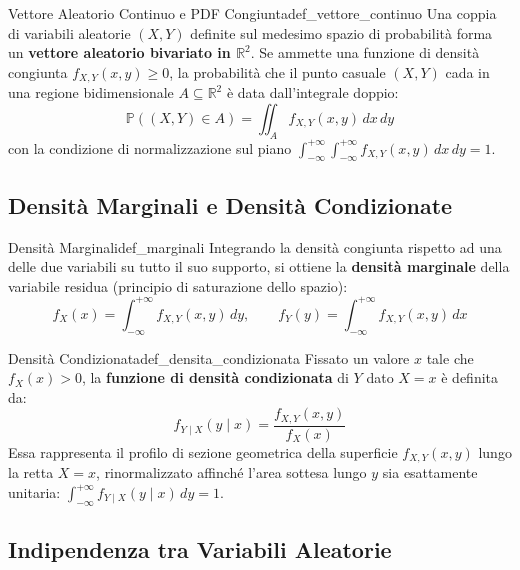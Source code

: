 \begin{definizione}{Vettore Aleatorio Continuo e PDF Congiunta}{def_vettore_continuo}
Una coppia di variabili aleatorie $(X, Y)$ definite sul medesimo spazio di probabilità forma un \textbf{vettore aleatorio bivariato in $\mathbb{R}^2$}. Se ammette una funzione di densità congiunta $f_{X,Y}(x, y) \ge 0$, la probabilità che il punto casuale $(X, Y)$ cada in una regione bidimensionale $A \subseteq \mathbb{R}^2$ è data dall'integrale doppio:
\begin{equation}
    \mathbb{P}((X, Y) \in A) = \iint_A f_{X,Y}(x, y) \, dx \, dy
\end{equation}
con la condizione di normalizzazione sul piano $\int_{-\infty}^{+\infty}\int_{-\infty}^{+\infty} f_{X,Y}(x, y) \, dx \, dy = 1$.
\end{definizione}

\subsection{Densità Marginali e Densità Condizionate}

\begin{definizione}{Densità Marginali}{def_marginali}
Integrando la densità congiunta rispetto ad una delle due variabili su tutto il suo supporto, si ottiene la \textbf{densità marginale} della variabile residua (principio di saturazione dello spazio):
\begin{equation}
    f_X(x) = \int_{-\infty}^{+\infty} f_{X,Y}(x, y) \, dy, \qquad f_Y(y) = \int_{-\infty}^{+\infty} f_{X,Y}(x, y) \, dx
\end{equation}
\end{definizione}

\begin{definizione}{Densità Condizionata}{def_densita_condizionata}
Fissato un valore $x$ tale che $f_X(x) > 0$, la \textbf{funzione di densità condizionata} di $Y$ dato $X = x$ è definita da:
\begin{equation}
    f_{Y \mid X}(y \mid x) = \frac{f_{X,Y}(x, y)}{f_X(x)}
\end{equation}
Essa rappresenta il profilo di sezione geometrica della superficie $f_{X,Y}(x, y)$ lungo la retta $X = x$, rinormalizzato affinché l'area sottesa lungo $y$ sia esattamente unitaria: $\int_{-\infty}^{+\infty} f_{Y \mid X}(y \mid x) \, dy = 1$.
\end{definizione}

\subsection{Indipendenza tra Variabili Aleatorie}

